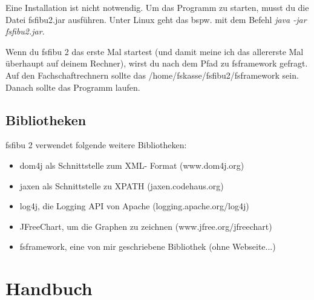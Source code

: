 \documentclass[a4paper,10pt,halfparskip,oneside,smallheadings]{scrbook}
\begin{document}
Eine Installation ist nicht notwendig. Um das Programm zu starten, musst du die Datei fsfibu2.jar ausführen. Unter Linux geht das bspw. mit dem Befehl \textit{java -jar fsfibu2.jar}.

Wenn du fsfibu 2 das erste Mal startest (und damit meine ich das allererste Mal überhaupt auf deinem Rechner), wirst 
du nach dem Pfad zu fsframework gefragt. Auf den Fachschaftrechnern sollte das /home/fskasse/fsfibu2/fsframework sein. Danach sollte das Programm laufen.

\section{Bibliotheken}
fsfibu 2 verwendet folgende weitere Bibliotheken:
\begin{itemize}
 \item dom4j als Schnittstelle zum XML- Format (www.dom4j.org)
 \item jaxen als Schnittstelle zu XPATH (jaxen.codehaus.org)
 \item log4j, die Logging API von Apache (logging.apache.org/log4j)
 \item JFreeChart, um die Graphen zu zeichnen (www.jfree.org/jfreechart)
 \item fsframework, eine von mir geschriebene Bibliothek (ohne Webseite...)
\end{itemize}


\chapter{Handbuch}
\end{document}
